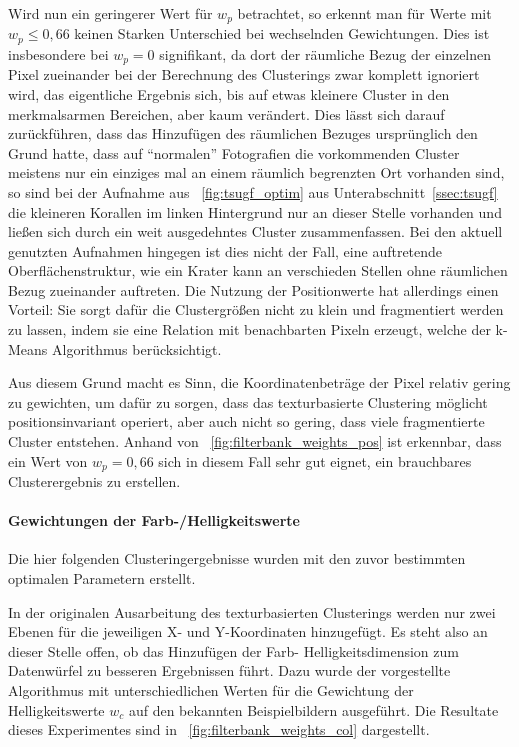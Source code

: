 Wird nun ein geringerer Wert für $w_p$ betrachtet, so erkennt man für Werte mit $w_p\leq0,66$ keinen Starken Unterschied bei wechselnden Gewichtungen. Dies ist insbesondere bei $w_p=0$ signifikant, da dort der räumliche Bezug der einzelnen Pixel zueinander bei der Berechnung des Clusterings zwar komplett ignoriert wird, das eigentliche Ergebnis sich, bis auf etwas kleinere Cluster in den merkmalsarmen Bereichen, aber kaum verändert. Dies lässt sich darauf zurückführen, dass das Hinzufügen des räumlichen Bezuges ursprünglich den Grund hatte, dass auf \enquote{normalen} Fotografien die vorkommenden Cluster meistens nur ein einziges mal an einem räumlich begrenzten Ort vorhanden sind, so sind \zB bei der Aufnahme aus \figurename~\ref{fig:tsugf_optim} aus Unterabschnitt~\ref{ssec:tsugf} die kleineren Korallen im linken Hintergrund nur an dieser Stelle vorhanden und ließen sich durch ein weit ausgedehntes Cluster zusammenfassen. Bei den aktuell genutzten Aufnahmen hingegen ist dies nicht der Fall, eine auftretende Oberflächenstruktur, wie \zB ein Krater kann an verschieden Stellen ohne räumlichen Bezug zueinander auftreten.
Die Nutzung der Positionwerte hat allerdings einen Vorteil: Sie sorgt dafür die Clustergrößen nicht zu klein und fragmentiert werden zu lassen, indem sie eine Relation mit benachbarten Pixeln erzeugt, welche der k-Means Algorithmus berücksichtigt.

Aus diesem Grund macht es Sinn, die Koordinatenbeträge der Pixel relativ gering zu gewichten, um dafür zu sorgen, dass das texturbasierte Clustering möglicht positionsinvariant operiert, aber auch nicht so gering, dass viele fragmentierte Cluster entstehen. Anhand von \figurename~\ref{fig:filterbank_weights_pos} ist erkennbar, dass ein Wert von  $w_p=0,66$ sich in diesem Fall sehr gut eignet, ein brauchbares Clusterergebnis zu erstellen.

\paragraph{Gewichtungen der Farb-/Helligkeitswerte}
Die hier folgenden Clusteringergebnisse wurden mit den zuvor bestimmten optimalen Parametern erstellt.

In der originalen Ausarbeitung des texturbasierten Clusterings \cite{jain_91} werden nur zwei Ebenen für die jeweiligen X- und Y-Koordinaten hinzugefügt. Es steht also an dieser Stelle offen, ob das Hinzufügen der Farb- \bzw Helligkeitsdimension zum Datenwürfel zu besseren Ergebnissen führt. Dazu wurde der vorgestellte Algorithmus mit unterschiedlichen Werten für die Gewichtung der Helligkeitswerte $w_c$ auf den bekannten Beispielbildern ausgeführt. Die Resultate dieses Experimentes sind in \figurename~\ref{fig:filterbank_weights_col} dargestellt.

